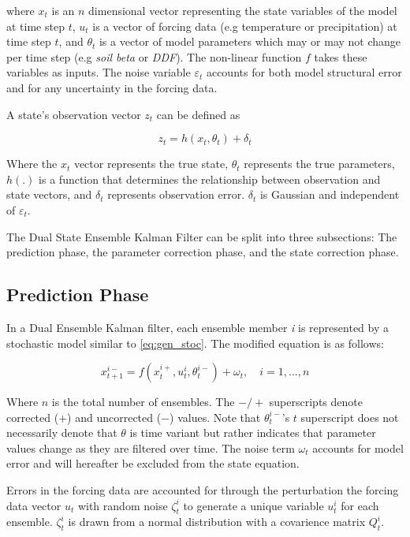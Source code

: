 \documentclass[utf8]{frontiersSCNS} %
\begin{document}
where $x_{t}$ is an $n$ dimensional vector representing the state variables of the model at time step $t$, $u_{t}$ is a vector of forcing data (e.g temperature or precipitation) at time step $t$, and $\theta_{t}$ is a vector of model parameters which may or may not change per time step (e.g \textit{soil beta }or \textit{DDF}). The non-linear function $f$ takes these variables as inputs. The noise variable $\varepsilon_{t}$ accounts for both model structural error and for any uncertainty in the forcing data.

A state's observation vector $z_{t}$ can be defined as

\begin{equation}\label{eq:gen_obs}
z_{t} = h(x_{t}, \theta_{t}) + \delta_{t}
\end{equation}

Where the $x_{t}$ vector represents the true state, $\theta_{t}$ represents the true parameters, $h(.)$ is a function that determines the relationship between observation and state vectors, and $\delta_{t}$ represents observation error. $\delta_{t}$ is Gaussian and independent of $\varepsilon_{t}$.

The Dual State Ensemble Kalman Filter can be split into three subsections: The prediction phase, the parameter correction phase, and the state correction phase. 

\subsection{Prediction Phase}

In a Dual Ensemble Kalman filter, each ensemble member \textit{i} is represented by a stochastic model similar to \eqref{eq:gen_stoc}. The modified equation is as follows:

\begin{equation}\label{eq:dekf_predict}
x_{t+1}^{i-} = f(x_{t}^{i+}, u_{t}^{i}, \theta^{i-}_{t}) + \omega_{t}, \quad i=1,...,n
\end{equation}

Where $n$ is the total number of ensembles. The $-/+$ superscripts denote corrected ($+$) and uncorrected ($-$) values. Note that $\theta^{i-}_{t}$'s $t$ superscript does not necessarily denote that $\theta$ is time variant but rather indicates that parameter values change as they are filtered over time. The noise term $\omega_{t}$ accounts for model error and will hereafter be excluded from the state equation.

Errors in the forcing data are accounted for through the perturbation the forcing data vector $u_{t}$ with random noise $\zeta_{t}^{i}$ to generate a unique variable $u_{t}^{i}$ for each ensemble. $\zeta_{t}^{i}$ is drawn from a normal distribution with a covarience matrix $Q_{t}^{i}$.
\end{document}
